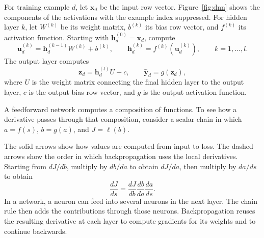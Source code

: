 For training example $d$, let $\bm{x}_d$ be the input row vector. Figure~\ref{fig:dnn} shows the components of the activations with the example index suppressed. For hidden layer $k$, let $W^{(k)}$ be its weight matrix, $b^{(k)}$ its bias row vector, and $f^{(k)}$ its activation function. Starting with $\bm{h}_d^{(0)}=\bm{x}_d$, compute
\begin{equation}
	\bm{u}_d^{(k)} = \bm{h}_d^{(k-1)}W^{(k)} + b^{(k)}, \qquad
	\bm{h}_d^{(k)} = f^{(k)}(\bm{u}_d^{(k)}), \qquad k=1,\dots,l.
\end{equation}
The output layer computes
\begin{equation}
	\bm{z}_d = \bm{h}_d^{(l)}U + c, \qquad
	\hat{\bm{y}}_d = g(\bm{z}_d),
\end{equation}
where $U$ is the weight matrix connecting the final hidden layer to the output layer, $c$ is the output bias row vector, and $g$ is the output activation function.

\begin{mdframed}[style=discusion, frametitle={Intuition for backpropagation}]
A feedforward network computes a composition of functions. To see how a derivative passes through that composition, consider a scalar chain in which $a=f(s)$, $b=g(a)$, and $J=\ell(b)$.

\begin{center}
\end{center}

The solid arrows show how values are computed from input to loss. The dashed arrows show the order in which backpropagation uses the local derivatives. Starting from $dJ/db$, multiply by $db/da$ to obtain $dJ/da$, then multiply by $da/ds$ to obtain
\begin{equation*}
    \frac{dJ}{ds}=\frac{dJ}{db}\frac{db}{da}\frac{da}{ds}.
\end{equation*}
In a network, a neuron can feed into several neurons in the next layer. The chain rule then adds the contributions through those neurons. Backpropagation reuses the resulting derivative at each layer to compute gradients for its weights and to continue backwards.
\end{mdframed}

